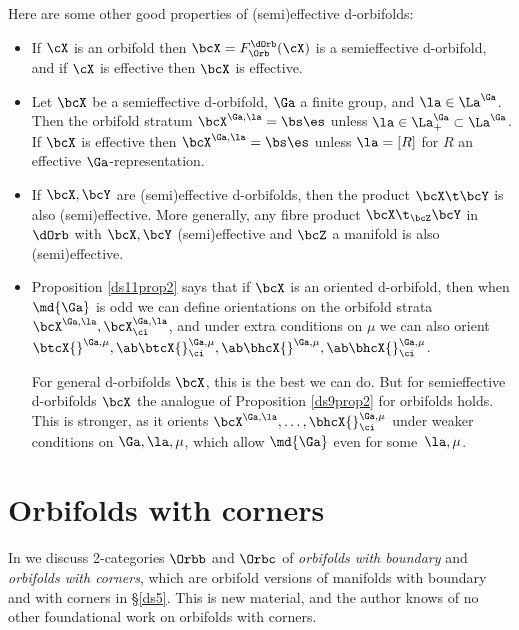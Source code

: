 \documentclass{article}
\begin{document}
Here are some other good properties of (semi)effective d-orbifolds:
\begin{itemize}
\setlength{\itemsep}{0pt}
\setlength{\parsep}{0pt}
\item If $\cX$ is an orbifold then $\bcX=F_\Orb^\dOrb(\cX)$ is
a semieffective d-orbifold, and if $\cX$ is effective then
$\bcX$ is effective.
\item Let $\bcX$ be a semieffective d-orbifold, $\Ga$
a finite group, and $\la\in\La^\Ga$. Then the orbifold stratum
$\bcX^{\Ga,\la}=\bs\es$ unless $\la\in\La^\Ga_+\subset\La^\Ga$.
If $\bcX$ is effective then $\bcX^{\Ga,\la}=\bs\es$ unless
$\la=[R]$ for $R$ an effective
$\Ga$-representation.
\item If $\bcX,\bcY$ are (semi)effective d-orbifolds, then
the product $\bcX\t\bcY$ is also (semi)effective. More
generally, any fibre product $\bcX\t_\bcZ\bcY$ in $\dOrb$ with
$\bcX,\bcY$ (semi)effective and $\bcZ$ a manifold is also
(semi)effective.
\item Proposition \ref{ds11prop2} says that if $\bcX$ is an
oriented d-orbifold, then when $\md{\Ga}$ is odd we can define
orientations on the orbifold strata $\bcX^{\Ga,\la},
\bcX^{\Ga,\la}_\ci$, and under extra conditions on $\mu$ we can
also orient $\btcX{}^{\Ga,\mu},\ab\btcX{}^{\Ga,\mu}_\ci,\ab
\bhcX{}^{\Ga,\mu},\ab\bhcX{}^{\Ga,\mu}_\ci$.

For general d-orbifolds $\bcX$, this is the best we can do. But
for semieffective d-orbifolds $\bcX$ the analogue of Proposition
\ref{ds9prop2} for orbifolds holds. This is stronger, as it
orients $\bcX^{\Ga,\la},\ldots, \bhcX{}^{\Ga,\mu}_\ci$ under
weaker conditions on $\Ga,\la,\mu$, which allow $\md{\Ga}$ even
for some~$\la,\mu$.%
\end{itemize}

\section{Orbifolds with corners}
\label{ds12}

In \cite[\S 8.5--\S 8.9]{Joyc6} we discuss 2-categories $\Orbb$ and
$\Orbc$ of {\it orbifolds with boundary\/} and {\it orbifolds with
corners}, which are orbifold versions of manifolds with boundary and
with corners in \S\ref{ds5}. This is new material, and the author
knows of no other foundational work on orbifolds with corners.
\end{document}
